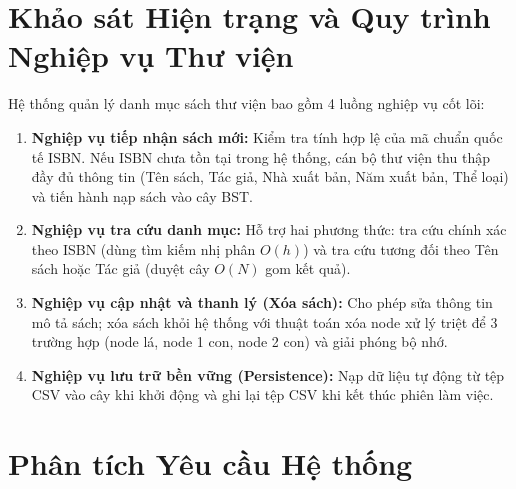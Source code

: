 \section{Khảo sát Hiện trạng và Quy trình Nghiệp vụ Thư viện}
Hệ thống quản lý danh mục sách thư viện bao gồm 4 luồng nghiệp vụ cốt lõi:
\begin{enumerate}
    \item \textbf{Nghiệp vụ tiếp nhận sách mới:} Kiểm tra tính hợp lệ của mã chuẩn quốc tế ISBN. Nếu ISBN chưa tồn tại trong hệ thống, cán bộ thư viện thu thập đầy đủ thông tin (Tên sách, Tác giả, Nhà xuất bản, Năm xuất bản, Thể loại) và tiến hành nạp sách vào cây BST.
    \item \textbf{Nghiệp vụ tra cứu danh mục:} Hỗ trợ hai phương thức: tra cứu chính xác theo ISBN (dùng tìm kiếm nhị phân $O(h)$) và tra cứu tương đối theo Tên sách hoặc Tác giả (duyệt cây $O(N)$ gom kết quả).
    \item \textbf{Nghiệp vụ cập nhật và thanh lý (Xóa sách):} Cho phép sửa thông tin mô tả sách; xóa sách khỏi hệ thống với thuật toán xóa node xử lý triệt để 3 trường hợp (node lá, node 1 con, node 2 con) và giải phóng bộ nhớ.
    \item \textbf{Nghiệp vụ lưu trữ bền vững (Persistence):} Nạp dữ liệu tự động từ tệp CSV vào cây khi khởi động và ghi lại tệp CSV khi kết thúc phiên làm việc.
\end{enumerate}

\section{Phân tích Yêu cầu Hệ thống}

